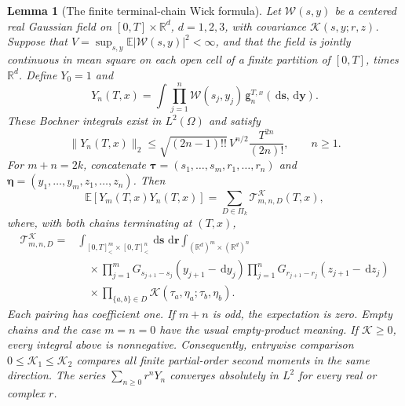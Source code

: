 \documentclass[12pt]{article}
\numberwithin{equation}{section}
\newtheorem{lemma}[theorem]{Lemma}
\theoremstyle{definition}
\newcommand{\R}{\mathbb{R}}
\newcommand{\E}{\mathbb{E}}
\newcommand{\ud}{\,\mathrm{d}}
\begin{document}
\begin{lemma}[The finite terminal-chain Wick formula]\label{L:terminal-wick}
  Let $\mathcal W(s,y)$ be a centered real Gaussian field on
  $[0,T]\times\R^d$, $d=1,2,3$, with covariance
  $\mathcal K(s,y;r,z)$. Suppose that
  $V=\sup_{s,y}\E|\mathcal W(s,y)|^2<\infty$, and that the field is
  jointly continuous in mean square on each open cell of a finite
  partition of $[0,T]$, times $\R^d$.
  Define $Y_0=1$ and
  \[
    Y_n(T,x)=\int\prod_{j=1}^n\mathcal W(s_j,y_j)
    \,\mathsf g_n^{T,x}(\ud\boldsymbol s,\ud\boldsymbol y).
  \]
  These Bochner integrals exist in $L^2(\Omega)$ and satisfy
  \begin{equation}\label{E:terminal-term-majorant}
    \|Y_n(T,x)\|_2
    \le\sqrt{(2n-1)!!}\,V^{n/2}\frac{T^{2n}}{(2n)!},
    \qquad n\ge1.
  \end{equation}
  For $m+n=2k$, concatenate
  $\boldsymbol\tau=(s_1,\ldots,s_m,r_1,\ldots,r_n)$ and
  $\boldsymbol\eta=(y_1,\ldots,y_m,z_1,\ldots,z_n)$. Then
  \begin{equation}\label{E:terminal-wick-formula}
    \E[Y_m(T,x)Y_n(T,x)]
    =\sum_{D\in\Pi_k}\mathcal T_{m,n,D}^{\mathcal K}(T,x),
  \end{equation}
  where, with both chains terminating at $(T,x)$,
  \begin{equation}\label{E:terminal-pairing-integral}
    \begin{split}
      \mathcal T_{m,n,D}^{\mathcal K}
      ={}&\int_{[0,T]^m_<\times[0,T]^n_<}
      \ud\boldsymbol s\,\ud\boldsymbol r
      \int_{(\R^d)^m\times(\R^d)^n}\\
      &\quad\times\prod_{j=1}^m
      G_{s_{j+1}-s_j}(y_{j+1}-\ud y_j)
      \prod_{j=1}^n
      G_{r_{j+1}-r_j}(z_{j+1}-\ud z_j)\\
      &\quad\times\prod_{\{a,b\}\in D}
      \mathcal K(\tau_a,\eta_a;\tau_b,\eta_b).
    \end{split}
  \end{equation}
  Each pairing has coefficient one. If $m+n$ is odd, the expectation
  is zero. Empty chains and the case $m=n=0$ have the usual empty-product
  meaning. If $\mathcal K\ge0$, every integral above is nonnegative.
  Consequently, entrywise comparison $0\le\mathcal K_1\le\mathcal K_2$
  compares all finite partial-order second moments in the same direction.
  The series $\sum_{n\ge0}r^nY_n$ converges absolutely in $L^2$ for
  every real or complex $r$.
\end{lemma}
\end{document}
